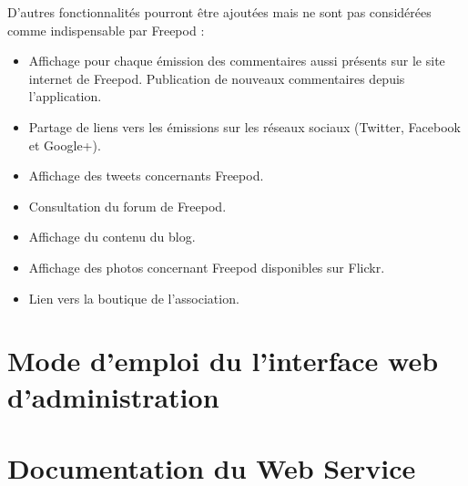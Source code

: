 \documentclass[11pt, french]{report}
\begin{document}
D’autres fonctionnalités pourront être ajoutées mais ne sont pas considérées comme indispensable par Freepod :
\begin{itemize}
\item Affichage pour chaque émission des commentaires aussi présents sur le site internet de Freepod. Publication de nouveaux commentaires depuis l’application.
\item Partage de liens vers les émissions sur les réseaux sociaux (Twitter, Facebook et Google+).
\item Affichage des tweets concernants Freepod.
\item Consultation du forum de Freepod.
\item Affichage du contenu du blog.
\item Affichage des photos concernant Freepod disponibles sur Flickr.
\item Lien vers la boutique de l’association.
\end{itemize}

\chapter{Mode d'emploi du l'interface web d'administration}




\chapter{Documentation du Web Service}





\nocite{*}

\end{document}
